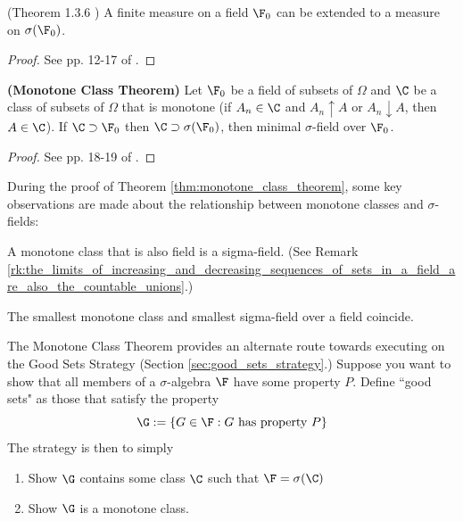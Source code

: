 \documentclass{article} %
\begin{document}
 \begin{theorem}
 (Theorem 1.3.6 \cite{ash2000probability}) A finite measure on a field $\F_0$ can be extended to a measure on $\sigma(\F_0)$. 	
 \label{thm:extension_of_finite_measure}
 \end{theorem}

\begin{proof}
See pp. 12-17 of \cite{ash2000probability}.	
\end{proof}

\begin{theorem}{\textbf{(Monotone Class Theorem)}}
Let $\F_0$ be a field of subsets of $\Omega$ and $\C$ be a class of subsets of $\Omega$ that is monotone (if $A_n \in \C$ and $A_n \uparrow 
A$ or $A_n \downarrow A$, then $A \in \C$).  If $\C \supset \F_0$ then $\C \supset \sigma(\F_0)$, then minimal $\sigma$-field over $\F_0$. 
 \label{thm:monotone_class_theorem}
\end{theorem}

\begin{proof}
See pp. 18-19 of \cite{ash2000probability}.	
\end{proof}

\begin{remark}
During the proof of Theorem \ref{thm:monotone_class_theorem}, some key observations are made about the relationship between monotone classes and $\sigma$-fields:
\begin{alphabate}
\item A monotone class that is also field is a sigma-field.  (See Remark \ref{rk:the_limits_of_increasing_and_decreasing_sequences_of_sets_in_a_field_are_also_the_countable_unions}.)
\item The smallest monotone class and smallest sigma-field over a field coincide. 
\end{alphabate}
\label{rk:monotone_classes_and_sigma_fields}
\end{remark}

\begin{remark}{}
The Monotone Class Theorem provides an alternate route towards executing on the Good Sets Strategy (Section \ref{sec:good_sets_strategy}.)  Suppose you want to show that all members of a $\sigma$-algebra   $\F$ have some property $P$.  Define ``good sets" as those that satisfy the property
\[ \G := \{ G \in \F : G \text{ has property } P \} \]
The strategy is then to simply
\begin{enumerate}
\item Show $\G$ contains some class $\C$ such that $\F = \sigma(\C)$
\item Show $\G$ is a monotone class.  
\end{enumerate}	 
\label{rk:monotone_class_theorem_for_executing_good_sets_strategy}
\end{remark}
\end{document}
